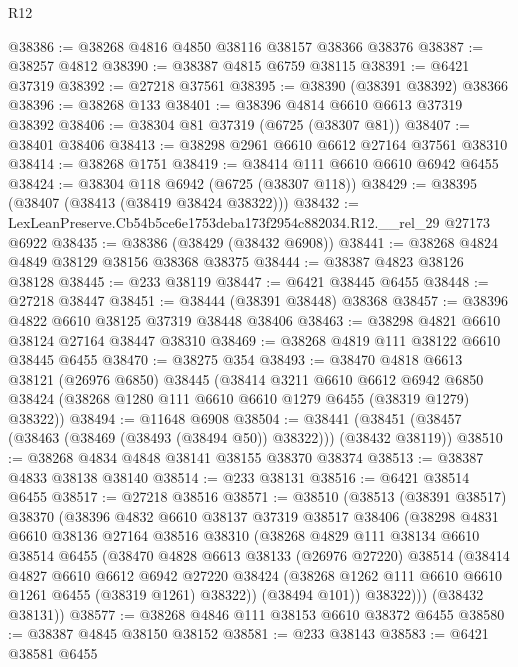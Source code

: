 \begin{lexlean}{R12}
\begin{coremodule}
@38386 := @38268 @4816 @4850 @38116 @38157 @38366 @38376
@38387 := @38257 @4812
@38390 := @38387 @4815 @6759 @38115
@38391 := @6421 @37319
@38392 := @27218 @37561
@38395 := @38390 (@38391 @38392) @38366
@38396 := @38268 @133
@38401 := @38396 @4814 @6610 @6613 @37319 @38392
@38406 := @38304 @81 @37319 (@6725 (@38307 @81))
@38407 := @38401 @38406
@38413 := @38298 @2961 @6610 @6612 @27164 @37561 @38310
@38414 := @38268 @1751
@38419 := @38414 @111 @6610 @6610 @6942 @6455
@38424 := @38304 @118 @6942 (@6725 (@38307 @118))
@38429 := @38395 (@38407 (@38413 (@38419 @38424 @38322)))
@38432 := LexLeanPreserve.Cb54b5ce6e1753deba173f2954c882034.R12.__rel_29 @27173 @6922
@38435 := @38386 (@38429 (@38432 @6908))
@38441 := @38268 @4824 @4849 @38129 @38156 @38368 @38375
@38444 := @38387 @4823 @38126 @38128
@38445 := @233 @38119
@38447 := @6421 @38445 @6455
@38448 := @27218 @38447
@38451 := @38444 (@38391 @38448) @38368
@38457 := @38396 @4822 @6610 @38125 @37319 @38448 @38406
@38463 := @38298 @4821 @6610 @38124 @27164 @38447 @38310
@38469 := @38268 @4819 @111 @38122 @6610 @38445 @6455
@38470 := @38275 @354
@38493 := @38470
    @4818
    @6613
    @38121
    (@26976 @6850)
    @38445
    (@38414
      @3211
      @6610
      @6612
      @6942
      @6850
      @38424
      (@38268 @1280 @111 @6610 @6610 @1279 @6455 (@38319 @1279) @38322))
@38494 := @11648 @6908
@38504 := @38441 (@38451 (@38457 (@38463 (@38469 (@38493 (@38494 @50)) @38322))) (@38432 @38119))
@38510 := @38268 @4834 @4848 @38141 @38155 @38370 @38374
@38513 := @38387 @4833 @38138 @38140
@38514 := @233 @38131
@38516 := @6421 @38514 @6455
@38517 := @27218 @38516
@38571 := @38510
    (@38513
      (@38391 @38517)
      @38370
      (@38396
        @4832
        @6610
        @38137
        @37319
        @38517
        @38406
        (@38298
          @4831
          @6610
          @38136
          @27164
          @38516
          @38310
          (@38268
            @4829
            @111
            @38134
            @6610
            @38514
            @6455
            (@38470
              @4828
              @6613
              @38133
              (@26976 @27220)
              @38514
              (@38414
                @4827
                @6610
                @6612
                @6942
                @27220
                @38424
                (@38268 @1262 @111 @6610 @6610 @1261 @6455 (@38319 @1261) @38322))
              (@38494 @101))
            @38322)))
      (@38432 @38131))
@38577 := @38268 @4846 @111 @38153 @6610 @38372 @6455
@38580 := @38387 @4845 @38150 @38152
@38581 := @233 @38143
@38583 := @6421 @38581 @6455

\end{coremodule}
\end{lexlean}
